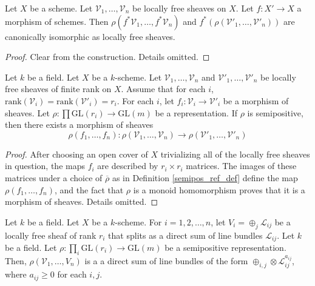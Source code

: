 \begin{lemma}\label{pullback_and_rho_commute}
Let $X$ be a scheme.
Let $\mathcal{V}_1,\ldots,\mathcal{V}_n$ be locally free sheaves on $X$. Let $f:X'\rightarrow X$ a morphism of schemes.
Then $\rho(f^*\mathcal{V}_1,\dots,f^*\mathcal{V}_n)$ and $f^*(\rho(\mathcal{V}'_1,\dots,\mathcal{V}'_n))$ are canonically isomorphic as locally free sheaves.
\end{lemma}

\begin{proof}
Clear from the construction. Details omitted.
\end{proof}


\begin{lemma}\label{functoriality_rho}
Let $k$ be a field.
Let $X$ be a $k$-scheme.
Let $\mathcal{V}_1,\dots, \mathcal{V}_n$ and $\mathcal{V}'_1,\dots,\mathcal{V}'_n$ be locally free sheaves of finite rank on $X$.
Assume that for each $i$, $\mathrm{rank}(\mathcal{V}_i)=\mathrm{rank}(\mathcal{V}'_i)=r_i$.
For each $i$, let $f_i:\mathcal{V}_i\rightarrow \mathcal{V}'_i$ be a morphism of sheaves.
Let $\rho:\prod\mathrm{GL}(r_i)\to\mathrm{GL}(m)$ be a representation.
If $\rho$ is semipositive, then there exists a morphism of sheaves
$$
\rho(f_1,\dots, f_n):\rho(\mathcal{V}_1,\ldots,\mathcal{V}_n)\rightarrow \rho(\mathcal{V}'_1,\dots,\mathcal{V}'_n)
$$
\end{lemma}

\begin{proof}
After choosing an open cover of $X$ trivializing all of the locally free sheaves in question, the maps $f_i$ are described by $r_i\times r_i$ matrices. The images of these matrices under a choice of $\overline{\rho}$ as in Definition \ref{semipos_ref_def} define the map $\rho(f_1,\ldots,f_n)$, and the fact that $\rho$ is a monoid homomorphism proves that it is a morphism of sheaves. Details omitted.
\end{proof}








\begin{lemma}\label{rho_of_split_bundle}
Let $k$ be a field.
Let $X$ be a $k$-scheme.
For $i=1,2,\ldots,n$, let $V_i=\oplus_{j}\mathcal{L}_{ij}$ be a locally free sheaf of rank $r_i$ that splits as a direct sum of line bundles $\mathcal{L}_{ij}$.
Let $k$ be a field.
Let $\rho:\prod_{i}\mathrm{GL}(r_i)\to \mathrm{GL}(m)$ be a semipositive representation. 
Then, $\rho(\mathcal{V}_1,\ldots,V_n)$ is a a direct sum of line bundles of the form $\oplus_{i,j}\otimes\mathcal{L}_{ij}^{a_{ij}}$, where $a_{ij}\ge0$ for each $i,j$.
\end{lemma}

